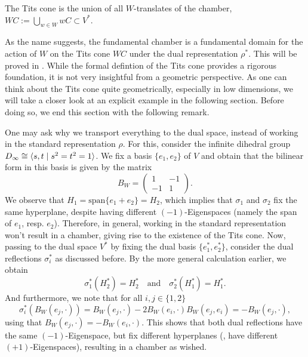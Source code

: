 \begin{definition}
    The Tits cone is the union of all \(W\)-translates of the chamber, \(WC := \underset{w \in W}{\bigcup} wC \subset V^*\).
\end{definition}

As the name suggests, the fundamental chamber is a fundamental domain for the action of \(W\) on the Tits cone \(WC\) under the dual representation \(\rho^*\).
This will be proved in .
While the formal defintion of the Tits cone provides a rigorous foundation, it is not very insightful from a geometric perspective.
As one can think about the Tits cone quite geometrically, especially in low dimensions, we will take a closer look at an explicit example in the following section.
Before doing so, we end this section with the following remark.

\begin{remark}
    One may ask why we transport everything to the dual space, instead of working in the standard representation \(\rho\).
    For this, consider the infinite dihedral group \(D_\infty \cong \langle s, t\;\vert\;s^2 = t^2 = 1\rangle\).
    We fix a basis \(\{e_1, e_2\}\) of \(V\) and obtain that the bilinear form in this basis is given by the matrix
    \begin{equation*}
        B_W = \begin{pmatrix}
            1  & -1 \\
            -1 & 1
        \end{pmatrix}.
    \end{equation*}
    We observe that \(H_1 = \text{span}\{e_1 + e_2\} = H_2\), which implies that \(\sigma_1\) and \(\sigma_2\) fix the same hyperplane, despite having different \((-1)\)-Eigenspaces (namely the span of \(e_1\), resp. \(e_2\)).
    Therefore, in general, working in the standard representation won't result in a chamber, giving rise to the existence of the Tits cone.
    Now, passing to the dual space \(V^*\) by fixing the dual basis \(\{e_1^*, e_2^*\}\), consider the dual reflections \(\sigma_i^*\) as discussed before.
    By the more general calculation earlier, we obtain
    \[\sigma_1^*(H_2^*) = H_2^* \quad\text{and}\quad \sigma_2^*(H_1^*) = H_1^*.\]
    And furthermore, we note that for all \(i,j\in\{1,2\}\)
    \[\sigma_i^*(B_W(e_j,\cdot)) = B_W(e_j,\cdot) - 2B_W(e_i,\cdot)B_W(e_j,e_i) = - B_W(e_j,\cdot),\]
    using that \(B_W(e_j,\cdot) = -B_W(e_i,\cdot)\).
    This shows that both dual reflections have the same \((-1)\)-Eigenspace, but fix different hyperplanes (\ie, have different \((+1)\)-Eigenspaces), resulting in a chamber as wished.
\end{remark}


